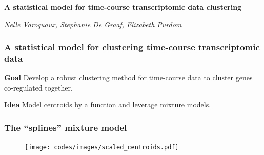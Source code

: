 \documentclass[xcolor=dvipsnames]{beamer}
\begin{document}
\begin{frame}
\frametitle{}
\vspace{4em}
{\bf \Large A statistical model for time-course transcriptomic data clustering}
\begin{flushright}
\footnotesize
\em Nelle Varoquaux, Stephanie De Graaf, Elizabeth Purdom
\end{flushright}
\end{frame}

\begin{frame}
\frametitle{A statistical model for clustering time-course transcriptomic data}
  

\textbf{\color{Blue} Goal} \quad Develop a robust clustering method for
time-course data to cluster genes co-regulated together.


\textbf{\color{Blue} Idea} \quad Model centroids by a function and leverage mixture
models.

\vspace{-2em}

\end{frame}
\begin{frame}
\frametitle{The ``splines'' mixture model}

\begin{figure}
\texttt{[image: codes/images/scaled\_centroids.pdf]}
\end{figure}

\end{frame}
\end{document}
